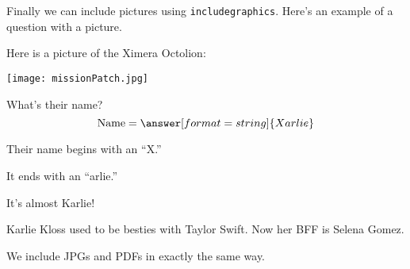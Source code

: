 \documentclass{ximera}
\begin{document}
Finally we can include pictures using \verb|includegraphics|. Here's an example of a question with a picture.
\begin{question}
    Here is a picture of the Ximera Octolion:
    \begin{center}
        \texttt{[image: missionPatch.jpg]}
    \end{center}
    What's their name?
    \[
    \text{Name} = \answer[format=string]{Xarlie}
    \]
    \begin{hint}
        Their name begins with an ``X.''
    \end{hint}
    \begin{hint}
        It ends with an ``arlie.''
    \end{hint}
    \begin{hint}
        It's almost Karlie!
    \end{hint}
\end{question}

Karlie Kloss used to be besties with Taylor Swift. Now her BFF is Selena Gomez.

We include JPGs and PDFs in exactly the same way.
\end{document}
